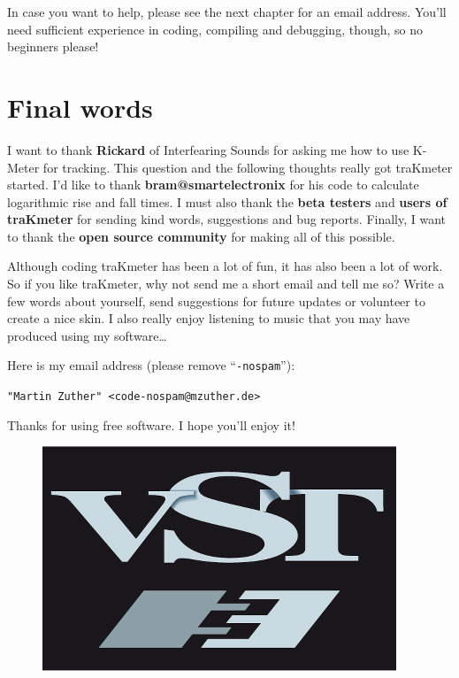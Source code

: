 In case you want to help, please see the next chapter for an email
address.  You’ll need sufficient experience in coding, compiling and
debugging, though, so no beginners please!

\chapter{Final words}
\label{chap:final_words}

I want to thank \textbf{Rickard} of Interfearing Sounds for asking me
how to use K-Meter for tracking.  This question and the following
thoughts really got traKmeter started.  I'd like to thank
\textbf{bram@smartelectronix} for his code to calculate logarithmic
rise and fall times.  I must also thank the \textbf{beta testers} and
\textbf{users of traKmeter} for sending kind words, suggestions and
bug reports.  Finally, I want to thank the \textbf{open source
  community} for making all of this possible.

Although coding traKmeter has been a lot of fun, it has also been a
lot of work.  So if you like traKmeter, why not send me a short email
and tell me so?  Write a few words about yourself, send suggestions
for future updates or volunteer to create a nice skin.  I also really
enjoy listening to music that you may have produced using my
software\dots

Here is my email address (please remove ``\texttt{-nospam}''):

\begin{center}
  \texttt{"Martin Zuther" <code-nospam@mzuther.de>}
\end{center}

Thanks for using free software.  I hope you'll enjoy it!

\begin{figure}
  \includegraphics[scale=0.40,clip]{include/images/trademark_vst.png}
\end{figure}

